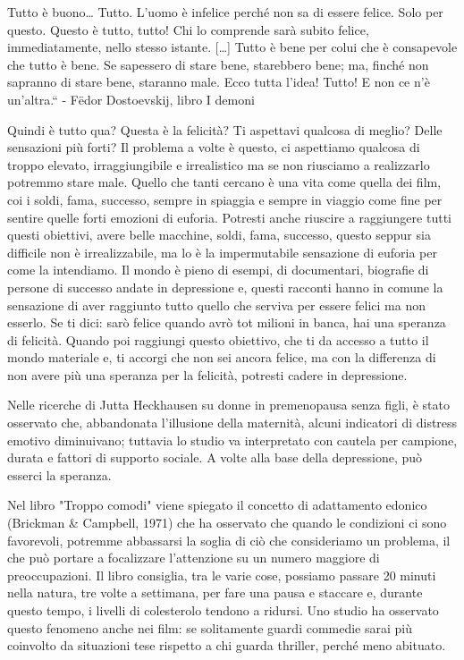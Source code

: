 \documentclass[12pt]{book} %
\begin{document}
Tutto è buono… Tutto. L'uomo è infelice perché non sa di essere felice. Solo per questo. Questo è tutto, tutto! Chi lo
comprende sarà subito felice, immediatamente, nello stesso istante. […] Tutto è bene per colui che è consapevole che
tutto è bene. Se sapessero di stare bene, starebbero bene; ma, finché non sapranno di stare bene, staranno male. Ecco
tutta l'idea! Tutto! E non ce n'è un'altra.“ - Fëdor Dostoevskij, libro I demoni

Quindi è tutto qua? Questa è la felicità? Ti aspettavi qualcosa di meglio? Delle sensazioni più forti? Il problema a volte è questo, ci aspettiamo qualcosa di troppo elevato, irraggiungibile e irrealistico ma se non riusciamo a
realizzarlo potremmo stare male. Quello che tanti cercano è una vita come quella dei film, coi i soldi, fama, successo,
sempre in spiaggia e sempre in viaggio come fine per sentire quelle forti emozioni di euforia. Potresti anche riuscire
a raggiungere tutti questi obiettivi, avere belle macchine, soldi, fama, successo, questo seppur sia difficile non è
irrealizzabile, ma lo è la impermutabile sensazione di euforia per come la intendiamo. Il mondo è pieno di esempi, di
documentari, biografie di persone di successo andate in depressione e, questi racconti hanno in comune la
sensazione di aver raggiunto tutto quello che serviva per essere felici ma non esserlo. Se ti dici: sarò felice quando
avrò tot milioni in banca, hai una speranza di felicità. Quando poi raggiungi questo obiettivo, che ti da accesso a
tutto il mondo materiale e, ti accorgi che non sei ancora felice, ma con la differenza di non avere più una speranza per la felicità, potresti cadere in depressione.

Nelle ricerche di Jutta Heckhausen su donne in premenopausa senza figli, è stato osservato che, abbandonata l’illusione della maternità, alcuni indicatori di distress emotivo diminuivano; tuttavia lo studio va interpretato con cautela per campione, durata e fattori di supporto sociale. A volte alla base della depressione, può esserci la speranza. 

Nel libro "Troppo comodi" viene spiegato il concetto di adattamento edonico (Brickman \& Campbell, 1971) che ha osservato che quando le condizioni ci sono favorevoli, potremme abbassarsi la soglia di ciò che consideriamo un problema, il che può portare a focalizzare l'attenzione su un numero maggiore di preoccupazioni. Il libro consiglia, tra le varie cose, possiamo passare 20 minuti nella natura, tre volte a settimana, per fare una pausa e staccare e, durante questo tempo, i livelli di colesterolo tendono a ridursi. Uno studio ha osservato questo fenomeno anche nei film: se solitamente guardi commedie sarai più coinvolto da situazioni tese rispetto a chi guarda thriller, perché meno abituato.
\end{document}
